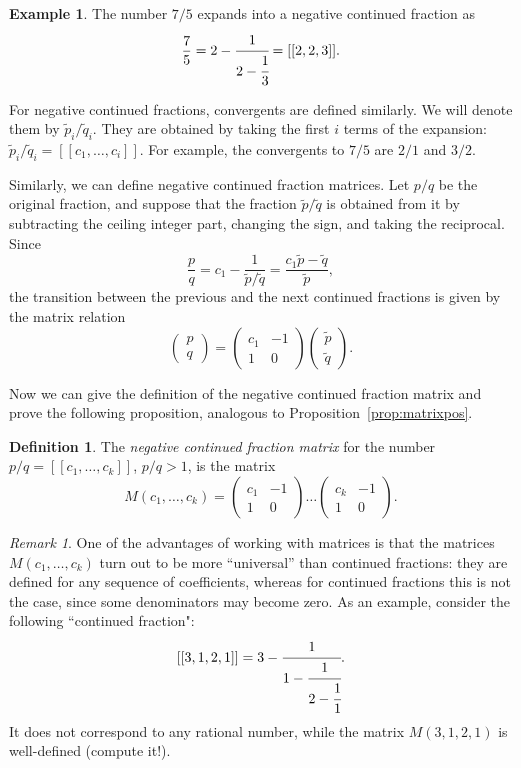 \documentclass[a4paper,11pt]{amsart}
\theoremstyle{plain}
\theoremstyle{remark}
\newtheorem{remark}[theorem]{Remark}
\theoremstyle{definition}
\newtheorem{definition}[theorem]{Definition}
\newtheorem{example}[theorem]{Example}
\numberwithin{equation}{section}
\numberwithin{figure}{section}
\begin{document}
\begin{example} The number $7/5$ expands into a negative continued fraction as
\[
\frac{7}{5} = 2 - \cfrac{1}{2 - \cfrac{1}{3}} = [[2, 2, 3]].
\]
\end{example}

For negative continued fractions, convergents are defined similarly. We will denote them by $\tilde{p}_i/\tilde{q}_i$. They are obtained by taking the first $i$ terms of the expansion: $\tilde{p}_i/\tilde{q}_i = [[c_1, \dots, c_i]]$. For example, the convergents to $7/5$ are $2/1$ and $3/2$.

Similarly, we can define negative continued fraction matrices. Let $p/q$ be the original fraction, and suppose that the fraction $\tilde{p}/\tilde{q}$ is obtained from it by subtracting the ceiling integer part, changing the sign, and taking the reciprocal. Since
\[
\frac{p}{q} = c_1 - \frac{1}{\tilde{p}/\tilde{q}} = \frac{c_1 \tilde{p} - \tilde{q}}{\tilde{p}},
\]
the transition between the previous and the next continued fractions is given by the matrix relation
\[
\begin{pmatrix}p\\q
\end{pmatrix}=
\begin{pmatrix}c_1 & -1\\1 & 0
\end{pmatrix}
\begin{pmatrix}\tilde{p}\\ \tilde{q}
\end{pmatrix}.
\]

Now we can give the definition of the negative continued fraction matrix and prove the following proposition, analogous to Proposition~\ref{prop:matrixpos}.

\begin{definition} The \emph{negative continued fraction matrix} for the number $p/q = [[c_1, \dots, c_k]]$, $p/q > 1$, is the matrix
\[
M(c_1, \dots, c_k) = \begin{pmatrix}c_1 & -1\\1 & 0
\end{pmatrix}
\dots 
\begin{pmatrix}c_k & -1\\1 & 0
\end{pmatrix}.
\]
\end{definition}

\begin{remark}
One of the advantages of working with matrices is that the matrices $M(c_1, \dots, c_k)$ turn out to be more ``universal'' than continued fractions: they are defined for any sequence of coefficients, whereas for continued fractions this is not the case, since some denominators may become zero. As an example, consider the following ``continued fraction":
\[
[[3, 1, 2, 1]] = 3 - \cfrac{1}{1 - \cfrac{1}{2 - \cfrac{1}{1}}}.
\]
It does not correspond to any rational number, while the matrix $M(3, 1, 2, 1)$ is well-defined (compute it!).
\end{remark}
\end{document}
